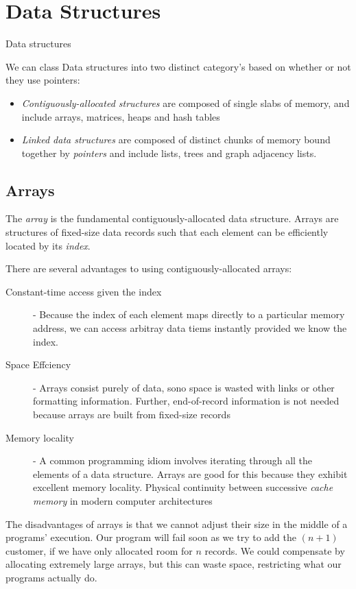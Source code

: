 
\chapter{Data Structures}
Data structures


We can class Data structures into two distinct category's based on whether or not they use pointers:
\begin{itemize}
	\item \textit{Contiguously-allocated structures} are composed of single slabs of memory, and include arrays, matrices, heaps and hash tables
	\item \textit{Linked data structures} are composed of distinct chunks of memory bound together by \textit{pointers} and include lists, trees and graph adjacency lists.
\end{itemize}

\section{Arrays}
	The \textit{array} is the fundamental contiguously-allocated data structure. Arrays are structures of fixed-size data records such that each element can be efficiently located by its \textit{index}.

	There are several advantages to using contiguously-allocated arrays:
	\begin{description}
		\item[Constant-time access given the index] - Because the index of each element maps directly to a particular memory address, we can access arbitray data tiems instantly provided we know the index.
		\item[Space Effciency] - Arrays consist purely of data, sono space is wasted with links or other formatting information. Further, end-of-record information is not needed because arrays are built from fixed-size records
		\item[Memory locality] - A common programming idiom involves iterating through all the elements of a data structure. Arrays are good for this because they exhibit excellent memory locality. Physical continuity between successive \textit{cache memory} in modern computer architectures
	\end{description}

	The disadvantages of arrays is that we cannot adjust their size in the middle of a programs' execution. Our program will fail soon as we try to add the $(n+1)$ customer, if we have only allocated room for $n$ records. We could compensate by allocating extremely large arrays, but this can waste space, restricting what our programs actually do.

